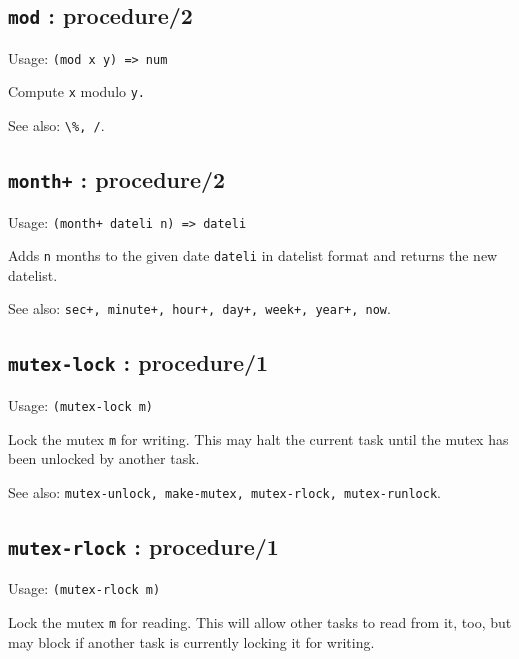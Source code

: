 \documentclass[
]{article}
\newcommand{\passthrough}[1]{#1}
\begin{document}
\hypertarget{mod-procedure2-1}{%
\subsection{\texorpdfstring{\texttt{mod} :
procedure/2}{mod : procedure/2}}\label{mod-procedure2-1}}

Usage: \passthrough{\lstinline!(mod x y) => num!}

Compute \passthrough{\lstinline!x!} modulo \passthrough{\lstinline!y.!}

See also: \passthrough{\lstinline!\%, /!}.

\hypertarget{month-procedure2-1}{%
\subsection{\texorpdfstring{\texttt{month+} :
procedure/2}{month+ : procedure/2}}\label{month-procedure2-1}}

Usage: \passthrough{\lstinline!(month+ dateli n) => dateli!}

Adds \passthrough{\lstinline!n!} months to the given date
\passthrough{\lstinline!dateli!} in datelist format and returns the new
datelist.

See also:
\passthrough{\lstinline!sec+, minute+, hour+, day+, week+, year+, now!}.

\hypertarget{mutex-lock-procedure1-1}{%
\subsection{\texorpdfstring{\texttt{mutex-lock} :
procedure/1}{mutex-lock : procedure/1}}\label{mutex-lock-procedure1-1}}

Usage: \passthrough{\lstinline!(mutex-lock m)!}

Lock the mutex \passthrough{\lstinline!m!} for writing. This may halt
the current task until the mutex has been unlocked by another task.

See also:
\passthrough{\lstinline!mutex-unlock, make-mutex, mutex-rlock, mutex-runlock!}.

\hypertarget{mutex-rlock-procedure1-1}{%
\subsection{\texorpdfstring{\texttt{mutex-rlock} :
procedure/1}{mutex-rlock : procedure/1}}\label{mutex-rlock-procedure1-1}}

Usage: \passthrough{\lstinline!(mutex-rlock m)!}

Lock the mutex \passthrough{\lstinline!m!} for reading. This will allow
other tasks to read from it, too, but may block if another task is
currently locking it for writing.
\end{document}
